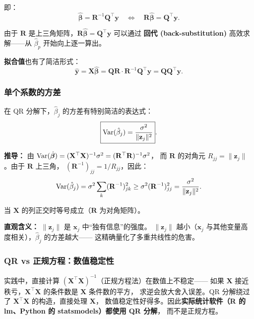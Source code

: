 即：
\[
    \boxed{\hat{\bm{\beta}} = \mathbf{R}^{-1} \mathbf{Q}^\top \mathbf{y}}
    \quad\Longleftrightarrow\quad
    \boxed{\mathbf{R} \hat{\bm{\beta}} = \mathbf{Q}^\top \mathbf{y}}.
\]

由于 $\mathbf{R}$ 是上三角矩阵，$\mathbf{R} \hat{\bm{\beta}} = \mathbf{Q}^\top \mathbf{y}$ 可以通过
\textbf{回代 (back-substitution)} 高效求解——从 $\hat{\beta}_p$ 开始向上逐一算出。

\textbf{拟合值}也有了简洁形式：
\[
    \hat{\mathbf{y}} = \mathbf{X} \hat{\bm{\beta}} = \mathbf{Q}\mathbf{R} \cdot \mathbf{R}^{-1} \mathbf{Q}^\top \mathbf{y}
    = \mathbf{Q} \mathbf{Q}^\top \mathbf{y}.
\]

\subsubsection{单个系数的方差}

在 QR 分解下，$\hat{\beta}_j$ 的方差有特别简洁的表达式：
\begin{equation}\label{eq:var_qr}
    \boxed{\mathrm{Var}(\hat{\beta}_j) = \frac{\sigma^2}{\|\mathbf{z}_j\|^2}}.
\end{equation}

\textbf{推导：} 由 $\mathrm{Var}(\hat{\bm{\beta}}) = (\mathbf{X}^\top \mathbf{X})^{-1} \sigma^2 = (\mathbf{R}^\top \mathbf{R})^{-1} \sigma^2$，
而 $\mathbf{R}$ 的对角元 $R_{jj} = \|\mathbf{z}_j\|$。由于 $\mathbf{R}$ 上三角，
$(\mathbf{R}^{-1})_{jj} = 1 / R_{jj}$，因此：
\[
    \mathrm{Var}(\hat{\beta}_j) = \sigma^2 \sum_{k} (\mathbf{R}^{-1})_{jk}^2
    \ge \sigma^2 (\mathbf{R}^{-1})_{jj}^2 = \frac{\sigma^2}{\|\mathbf{z}_j\|^2}.
\]

当 $\mathbf{X}$ 的列正交时等号成立（$\mathbf{R}$ 为对角矩阵）。

\textbf{直观含义：} $\|\mathbf{z}_j\|$ 是 $\mathbf{x}_j$ 中``独有信息''的强度。
$\|\mathbf{z}_j\|$ 越小（$\mathbf{x}_j$ 与其他变量高度相关），$\hat{\beta}_j$ 的方差越大——
这精确量化了多重共线性的危害。

\subsubsection{QR vs 正规方程：数值稳定性}

实践中，直接计算 $(\mathbf{X}^\top \mathbf{X})^{-1}$（正规方程法）在数值上不稳定——
如果 $\mathbf{X}$ 接近秩亏，$\mathbf{X}^\top \mathbf{X}$ 的条件数是 $\mathbf{X}$ 条件数的平方，
求逆会放大舍入误差。QR 分解绕过了 $\mathbf{X}^\top \mathbf{X}$ 的构造，直接处理 $\mathbf{X}$，
数值稳定性好得多。因此\textbf{实际统计软件（R 的 lm、Python 的 statsmodels）都使用 QR 分解}，
而不是正规方程。


